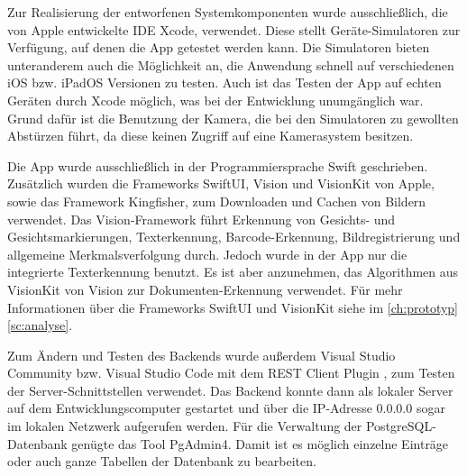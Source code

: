 \documentclass[notables, nomenclature, oneside, 150]{HSMW-Thesis}
\begin{document}
		Zur Realisierung der entworfenen Systemkomponenten wurde ausschließlich, die von Apple entwickelte IDE Xcode, verwendet. Diese stellt Geräte-Simulatoren zur Verfügung, auf denen die App getestet werden kann. Die Simulatoren bieten unteranderem auch die Möglichkeit an, die Anwendung schnell auf verschiedenen iOS bzw. iPadOS Versionen zu testen. Auch ist das Testen der App auf echten Geräten durch Xcode möglich, was bei der Entwicklung unumgänglich war. Grund dafür ist die Benutzung der Kamera, die bei den Simulatoren zu gewollten Abstürzen führt, da diese keinen Zugriff auf eine Kamerasystem besitzen.
		
		Die App wurde ausschließlich in der Programmiersprache Swift geschrieben. Zusätzlich wurden die Frameworks SwiftUI, Vision und VisionKit von Apple, sowie das Framework Kingfisher, zum Downloaden und Cachen von Bildern verwendet. Das Vision-Framework führt Erkennung von Gesichts- und Gesichtsmarkierungen, Texterkennung, Barcode-Erkennung, Bildregistrierung und allgemeine Merkmalsverfolgung durch. Jedoch wurde in der App nur die integrierte Texterkennung benutzt. Es ist aber anzunehmen, das Algorithmen aus VisionKit von Vision zur Dokumenten-Erkennung verwendet. Für mehr Informationen über die Frameworks SwiftUI und VisionKit siehe im \autoref{ch:prototyp} \autoref{sc:analyse}.
		
		Zum Ändern und Testen des Backends wurde außerdem Visual Studio Community bzw. Visual Studio Code mit dem REST Client Plugin , zum Testen der Server-Schnittstellen verwendet. Das Backend konnte dann als lokaler Server auf dem Entwicklungscomputer gestartet und über die IP-Adresse 0.0.0.0 sogar im lokalen Netzwerk aufgerufen werden. Für die Verwaltung der PostgreSQL-Datenbank genügte das Tool PgAdmin4. Damit ist es möglich einzelne Einträge oder auch ganze Tabellen der Datenbank zu bearbeiten.
		
\end{document}

